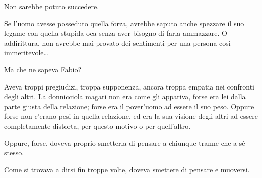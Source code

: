 Non sarebbe potuto succedere. 

Se l'uomo avesse posseduto quella forza, avrebbe saputo anche spezzare il suo legame con quella stupida oca senza aver bisogno di farla ammazzare. O addirittura, non avrebbe mai provato dei sentimenti per una persona così immeritevole\ldots

Ma che ne sapeva Fabio? 

Aveva troppi pregiudizi, troppa supponenza, ancora troppa empatia nei confronti degli altri. La donnicciola magari non era come gli appariva, forse era lei dalla parte giusta della relazione; forse era il pover'uomo ad essere il suo peso. Oppure forse non c'erano pesi in quella relazione, ed era la sua visione degli altri ad essere completamente distorta, per questo motivo o per quell'altro. 

Oppure, forse, doveva proprio smetterla di pensare a chiunque tranne che a sé stesso. 

Come si trovava a dirsi fin troppe volte, doveva smettere di pensare e muoversi.
